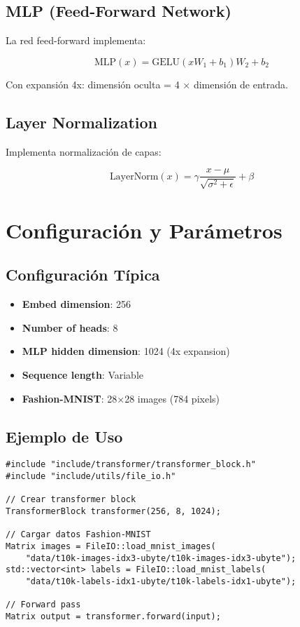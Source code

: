 \documentclass[12pt,a4paper]{article}
\begin{document}
\subsection{MLP (Feed-Forward Network)}

La red feed-forward implementa:

\begin{equation}
\text{MLP}(x) = \text{GELU}(xW_1 + b_1)W_2 + b_2
\end{equation}

Con expansión 4x: dimensión oculta = 4 × dimensión de entrada.

\subsection{Layer Normalization}

Implementa normalización de capas:

\begin{equation}
\text{LayerNorm}(x) = \gamma \frac{x - \mu}{\sqrt{\sigma^2 + \epsilon}} + \beta
\end{equation}

\section{Configuración y Parámetros}

\subsection{Configuración Típica}

\begin{itemize}
    \item \textbf{Embed dimension}: 256
    \item \textbf{Number of heads}: 8
    \item \textbf{MLP hidden dimension}: 1024 (4x expansion)
    \item \textbf{Sequence length}: Variable
    \item \textbf{Fashion-MNIST}: 28×28 images (784 pixels)
\end{itemize}

\subsection{Ejemplo de Uso}

\begin{lstlisting}[caption=Uso básico del Transformer]
#include "include/transformer/transformer_block.h"
#include "include/utils/file_io.h"

// Crear transformer block
TransformerBlock transformer(256, 8, 1024);

// Cargar datos Fashion-MNIST
Matrix images = FileIO::load_mnist_images(
    "data/t10k-images-idx3-ubyte/t10k-images-idx3-ubyte");
std::vector<int> labels = FileIO::load_mnist_labels(
    "data/t10k-labels-idx1-ubyte/t10k-labels-idx1-ubyte");

// Forward pass
Matrix output = transformer.forward(input);
\end{lstlisting}
\end{document}

